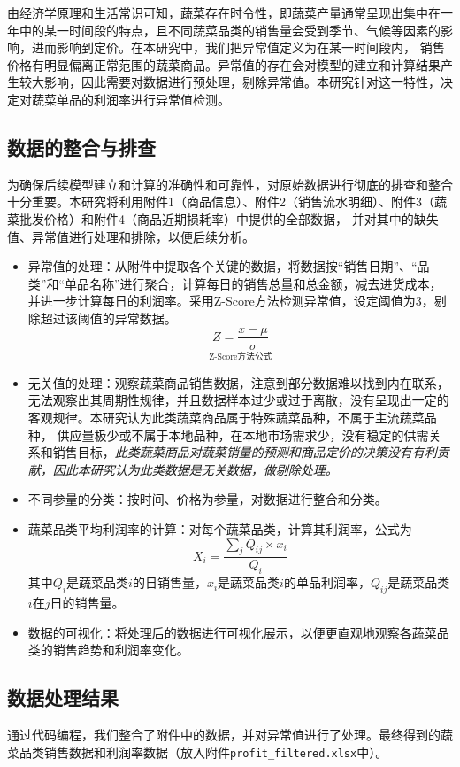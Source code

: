 \documentclass{article}
\begin{document}
由经济学原理和生活常识可知，蔬菜存在时令性，即蔬菜产量通常呈现出集中在一年中的某一时间段的特点，且不同蔬菜品类的销售量会受到季节、气候等因素的影响，进而影响到定价。在本研究中，我们把异常值定义为在某一时间段内，
销售价格有明显偏离正常范围的蔬菜商品。异常值的存在会对模型的建立和计算结果产生较大影响，因此需要对数据进行预处理，剔除异常值。本研究针对这一特性，决定对蔬菜单品的利润率进行异常值检测。
\subsection{数据的整合与排查}
为确保后续模型建立和计算的准确性和可靠性，对原始数据进行彻底的排查和整合十分重要。本研究将利用附件1（商品信息）、附件2（销售流水明细）、附件3（蔬菜批发价格）和附件4（商品近期损耗率）中提供的全部数据，
并对其中的缺失值、异常值进行处理和排除，以便后续分析。
\begin{itemize}
    \item 异常值的处理：从附件中提取各个关键的数据，将数据按“销售日期”、“品类”和“单品名称”进行聚合，计算每日的销售总量和总金额，减去进货成本，并进一步计算每日的利润率。采用Z-Score方法检测异常值，设定阈值为3，剔除超过该阈值的异常数据。
    \[
\underset{\text{Z-Score方法公式}}{Z = \frac{x - \mu}{\sigma}}
\]

    \item 无关值的处理：观察蔬菜商品销售数据，注意到部分数据难以找到内在联系，无法观察出其周期性规律，并且数据样本过少或过于离散，没有呈现出一定的客观规律。本研究认为此类蔬菜商品属于特殊蔬菜品种，不属于主流蔬菜品种，
    供应量极少或不属于本地品种，在本地市场需求少，没有稳定的供需关系和销售目标，\textit{此类蔬菜商品对蔬菜销量的预测和商品定价的决策没有有利贡献，因此本研究认为此类数据是无关数据，做剔除处理。}
    
    \item 不同参量的分类：按时间、价格为参量，对数据进行整合和分类。
    
    \item 蔬菜品类平均利润率的计算：对每个蔬菜品类，计算其利润率，公式为
    \[
X_i = \frac{\sum_j Q_{ij} \times x_i}{Q_i}
\]
其中$Q_i$是蔬菜品类$i$的日销售量，$x_i$是蔬菜品类$i$的单品利润率，$Q_{ij}$是蔬菜品类$i$在$j$日的销售量。
    
    \item 数据的可视化：将处理后的数据进行可视化展示，以便更直观地观察各蔬菜品类的销售趋势和利润率变化。
\end{itemize}

\subsection{数据处理结果}
通过代码编程，我们整合了附件中的数据，并对异常值进行了处理。最终得到的蔬菜品类销售数据和利润率数据（放入附件\texttt{profit\_filtered.xlsx}中）。
\end{document}
